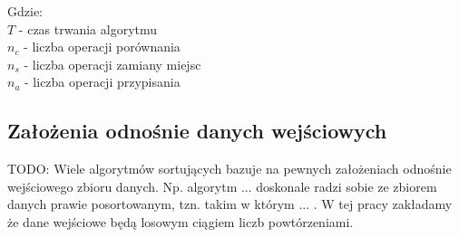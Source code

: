 Gdzie:\\
\boldmath$T$ - czas trwania algorytmu\\
$n_c$ - liczba operacji porównania\\
$n_s$ - liczba operacji zamiany miejsc\\
$n_a$ - liczba operacji przypisania\\

\subsection{Założenia odnośnie danych wejściowych}
TODO: Wiele algorytmów sortujących bazuje na pewnych założeniach odnośnie wejściowego zbioru danych.
Np. algorytm ... doskonale radzi sobie ze zbiorem danych prawie posortowanym, tzn.
takim w którym ... . W tej pracy zakładamy że dane wejściowe będą losowym ciągiem liczb powtórzeniami.
